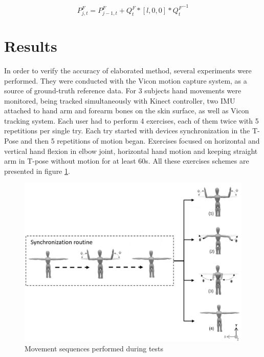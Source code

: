 \documentclass[sensors,article,submit,moreauthors,pdftex,10pt,a4paper]{mdpi}
\begin{document}
	\begin{equation} 	
		P_{j,t}^F=P_{j-1,t}^F+Q_t^F*[l,0,0]*{Q_t^F}^{-1}     
		\label{eq:hybrid:positionCalculationForm}              	
	\end{equation}
		
	\section{Results}
		
		
	In order to verify the accuracy of elaborated method, several experiments were performed. They were conducted with the Vicon motion capture system, as a source of ground-truth reference data. For 3 subjects hand movements were monitored, being tracked simultaneously with Kinect controller, two IMU attached to hand arm and forearm bones on the skin surface, as well as Vicon tracking system. Each user had to perform 4 exercises, each of them twice with 5 repetitions per single try. Each try started with devices synchronization in the T-Pose and then 5 repetitions of motion began. Exercises focused on horizontal and vertical hand flexion in elbow joint, horizontal hand motion and keeping straight arm in T-pose without motion for at least 60s. All these exercises schemes are presented in figure \ref{fig:results:sequences}.
		
	\begin{figure}[H]
		\centering
		\includegraphics[width=12cm]{Figure8.png}
		\caption{Movement sequences performed during tests}
		\label{fig:results:sequences}
	\end{figure}
		
\end{document}
